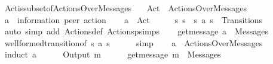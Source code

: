\begin{isabellebody}
\ Act{\isacharunderscore}{\kern0pt}is{\isacharunderscore}{\kern0pt}subset{\isacharunderscore}{\kern0pt}of{\isacharunderscore}{\kern0pt}ActionsOverMessages{\isacharcolon}{\kern0pt}\isanewline
\ \ \ {\isachardoublequoteopen}Act\ {\isasymsubseteq}\ ActionsOverMessages{\isachardoublequoteclose}\isanewline
%
\isadelimproof
%
\endisadelimproof
%
\isatagproof
{}\isamarkupfalse%
\isanewline
\ \ \isamarkupfalse%
\ a\ {\isacharcolon}{\kern0pt}{\isacharcolon}{\kern0pt}\ {\isachardoublequoteopen}{\isacharparenleft}{\kern0pt}{\isacharprime}{\kern0pt}information{\isacharcomma}{\kern0pt}\ {\isacharprime}{\kern0pt}peer{\isacharparenright}{\kern0pt}\ action{\isachardoublequoteclose}\isanewline
\ \ \isamarkupfalse%
\ {\isachardoublequoteopen}a\ {\isasymin}\ Act{\isachardoublequoteclose}\isanewline
\ \ \isamarkupfalse%
\ \isamarkupfalse%
\ s{}\ s{}\ \ {\isachardoublequoteopen}{\isacharparenleft}{\kern0pt}s{}{\isacharcomma}{\kern0pt}\ a{\isacharcomma}{\kern0pt}\ s{}{\isacharparenright}{\kern0pt}\ {\isasymin}\ Transitions{\isachardoublequoteclose}\isanewline
\ \ \ \ \isamarkupfalse%
\ {\isacharparenleft}{\kern0pt}auto\ simp\ add{\isacharcolon}{\kern0pt}\ Actions{\isacharunderscore}{\kern0pt}def\ Actionsp{\isachardot}{\kern0pt}simps{\isacharparenright}{\kern0pt}\isanewline
\ \ \isamarkupfalse%
\ {\isachardoublequoteopen}get{\isacharunderscore}{\kern0pt}message\ a\ {\isasymin}\ Messages{\isachardoublequoteclose}\isanewline
\ \ \ \ \isamarkupfalse%
\ well{\isacharunderscore}{\kern0pt}formed{\isacharunderscore}{\kern0pt}transition{\isacharbrackleft}{\kern0pt}of\ s{}\ a\ s{}{\isacharbrackright}{\kern0pt}\isanewline
\ \ \ \ \isamarkupfalse%
\ simp\isanewline
\ \ \isamarkupfalse%
\ {\isachardoublequoteopen}a\ {\isasymin}\ ActionsOverMessages{\isachardoublequoteclose}\isanewline
\ \ \isamarkupfalse%
\ {\isacharparenleft}{\kern0pt}induct\ a{\isacharparenright}{\kern0pt}\isanewline
\ \ \ \ \isamarkupfalse%
\ {\isacharparenleft}{\kern0pt}Output\ m{\isacharparenright}{\kern0pt}\isanewline
\ \ \ \ \isamarkupfalse%
\ {\isachardoublequoteopen}get{\isacharunderscore}{\kern0pt}message\ {\isacharparenleft}{\kern0pt}{\isacharbang}{\kern0pt}{\isasymlangle}m{\isasymrangle}{\isacharparenright}{\kern0pt}\ {\isasymin}\ Messages{\isachardoublequoteclose}\isanewline

\end{isabellebody}
